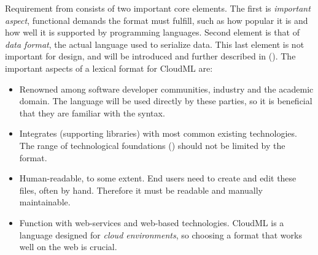 Requirement  from  consists of two
important core elements.
The first is \emph{important aspect}, \ie functional demands the format must fulfill,
such as how popular it is and how well it is supported by programming languages.
Second element is that of \emph{data format}, \ie the actual language used to 
serialize data.
This last element is not important for design, and will be introduced and
further described in  ().
The important aspects of a lexical format for CloudML are:
\begin{itemize}
  \item Renowned among software developer communities, industry and the academic domain.
    The language will be used directly by these parties, so it is beneficial
    that they are familiar with the syntax.
  \item Integrates (supporting libraries) with most common existing technologies.
    The range of technological foundations () should not be
    limited by the format.
  \item Human-readable, to some extent.
    End users need to create and edit these files, often by hand.
    Therefore it must be readable and manually maintainable.
  \item Function with web-services and web-based technologies.
    CloudML is a language designed for \emph{cloud environments},
    so choosing a format that works well on the web is crucial.
\end{itemize}
